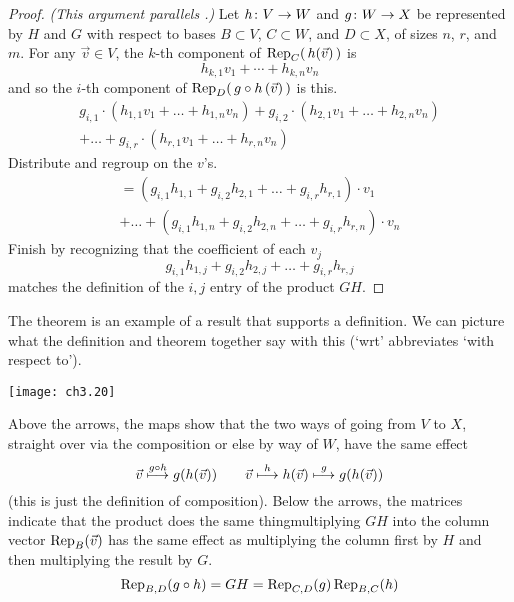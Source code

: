 \begin{proof}
\textit{(This argument parallels .)}
Let \( \map{h}{V}{W} \) and \( \map{g}{W}{X} \) be represented by
\( H \) and \( G \) with respect to bases
\( B\subset V \), \( C\subset W \), and \( D\subset X \), of sizes
\( n \), \( r \), and \( m \).
For any \( \vec{v}\in V \), the \( k \)-th component of
\( \rep{\,h(\vec{v})\,}{C} \) is
\begin{equation*}
  h_{k,1}v_1+\cdots+h_{k,n}v_n
\end{equation*}
and so the \( i \)-th component of
\( \rep{\,\composed{g}{h}\,(\vec{v})\,}{D} \) is this.
\begin{multline*}
  g_{i,1}\cdot(h_{1,1}v_1+\dots+h_{1,n}v_n)
  +g_{i,2}\cdot(h_{2,1}v_1+\dots+h_{2,n}v_n)  \\
  +\dots                                 
  +g_{i,r}\cdot(h_{r,1}v_1+\dots+h_{r,n}v_n)
\end{multline*}
Distribute and regroup on the \( v \)'s.
\begin{multline*}
  =(g_{i,1} h_{1,1}+g_{i,2} h_{2,1}+\dots+g_{i,r}h_{r,1})\cdot v_1    \\
   +\dots
   +(g_{i,1} h_{1,n}+g_{i,2} h_{2,n}
           +\dots+g_{i,r} h_{r,n})\cdot v_n
\end{multline*}
Finish by recognizing that the coefficient of each \( v_j \)
\begin{equation*}
  g_{i,1}h_{1,j}+g_{i,2}h_{2,j}+\dots+g_{i,r}h_{r,j}
\end{equation*}
matches the definition of the \( i,j \) entry of the  product \( GH \).
\end{proof}

The theorem is an example of a result that supports 
a definition.
We can picture what the definition and theorem together say with this 
(`wrt' abbreviates `with respect to').
\begin{center}
  \texttt{[image: ch3.20]}
\end{center}
Above the arrows, the maps show that the two ways of going from 
\( V \) to \( X \),
straight over via the composition or else by way of \( W \),
have the same effect 
\begin{equation*}
  \vec{v}\mapsunder{g\circ h}g(h(\vec{v}))
  \qquad
  \vec{v}\mapsunder{h}h(\vec{v})\mapsunder{g}g(h(\vec{v}))
\end{equation*}
(this is just the definition of composition).
Below the arrows, the matrices indicate that the product
does the same thing\Dash multiplying
$GH$ into the column vector $\rep{\vec{v}}{B}$ has the same
effect as  multiplying the column first by $H$ 
and then multiplying the result by $G$.
\begin{equation*}
   \rep{\composed{g}{h}}{B,D}
   =GH=
   \rep{g}{C,D}\,\rep{h}{B,C}
\end{equation*}

